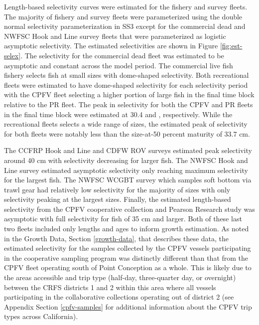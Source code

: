 \documentclass[11pt,
  english,
  letterpaper,
]{article}
\begin{document}
Length-based selectivity curves were estimated for the fishery and survey fleets. The majority of fishery and survey fleets were parameterized using the double normal selectivity parameterization in SS3 except for the commercial dead and NWFSC Hook and Line survey fleets that were parameterized as logistic asymptotic selectivity. The estimated selectivities are shown in Figure \ref{fig:est-selex}. The selectivity for the commercial dead fleet was estimated to be asymptotic and constant across the model period. The commercial live fish fishery selects fish at small sizes with dome-shaped selectivity. Both recreational fleets were estimated to have dome-shaped selectivity for each selectivity period with the CPFV fleet selecting a higher portion of large fish in the final time block relative to the PR fleet. The peak in selectivity for both the CPFV and PR fleets in the final time block were estimated at 30.4 and , respectively. While the recreational fleets selects a wide range of sizes, the estimated peak of selectivity for both fleets were notably less than the size-at-50 percent maturity of 33.7 cm.

The CCFRP Hook and Line and CDFW ROV surveys estimated peak selectivity around 40 cm with selectivity decreasing for larger fish. The NWFSC Hook and Line survey estimated asymptotic selectivity only reaching maximum selectivity for the largest fish. The NWFSC WCGBT survey which samples soft bottom via trawl gear had relatively low selectivity for the majority of sizes with only selectivity peaking at the largest sizes. Finally, the estimated length-based selectivity from the CPFV cooperative collection and Pearson Research study was asymptotic with full selectivity for fish of 35 cm and larger. Both of these last two fleets included only lengths and ages to inform growth estimation. As noted in the Growth Data, Section \ref{growth-data}, that describes these data, the estimated selectivity for the samples collected by the CPFV vessels participating in the cooperative sampling program was distinctly different than that from the CPFV fleet operating south of Point Conception as a whole. This is likely due to the areas accessible and trip type (half-day, three-quarter day, or overnight) between the CRFS districts 1 and 2 within this area where all vessels participating in the collaborative collections operating out of district 2 (see Appendix Section \ref{cpfv-samples} for additional information about the CPFV trip types across California).
\end{document}
